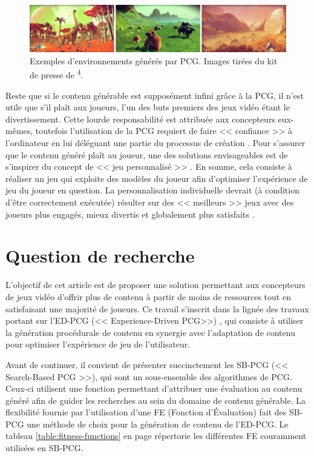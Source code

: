 \documentclass[a4paper,11pt]{article}
\begin{document}
      \begin{figure}
        \centering
        \includegraphics[width=\textwidth]{fig1.png}
        \caption{Exemples d'environnements générés par PCG. Images tirées du kit de presse de \textsuperscript{4}.}
        \label{fig:pcg}
      \end{figure}

      Reste que si le contenu générable est supposément infini grâce à la PCG, il n'est utile que s'il plaît aux joueurs, l'un des buts premiers des jeux vidéo étant le divertissement.
      Cette lourde responsabilité est attribuée aux concepteurs eux-mêmes, toutefois l'utilisation de la PCG requiert de faire << confiance >> à l'ordinateur en lui déléguant une partie du processus de création \cite{Riedl}.  
      Pour s'assurer que le contenu généré plaît au joueur, une des solutions envisageables est de s'inspirer du concept de << jeu personnalisé >> \cite{Bakkes}.
      En somme, cela consiste à réaliser un jeu qui exploite des modèles du joueur afin d'optimiser l'expérience de jeu du joueur en question.
      La personnalisation individuelle devrait (à condition d'être correctement exécutée) résulter sur des << meilleurs >> jeux avec des joueurs plus engagés, mieux divertis et globalement plus satisfaits \cite{Bakkes}.
      
    \section{Question de recherche}\label{section:subject}

      L'objectif de cet article est de proposer une solution permettant aux concepteurs de jeux vidéo d'offrir plus de contenu à partir de moins de ressources tout en satisfaisant une majorité de joueurs.
      Ce travail s'inscrit dans la lignée des travaux portant sur l'ED-PCG (<< Experience-Driven PCG>>) \cite{Yannakakis}, qui consiste à utiliser la génération procédurale de contenu en synergie avec l'adaptation de contenu pour optimiser l'expérience de jeu de l'utilisateur.
      
      Avant de continuer, il convient de présenter succinctement les SB-PCG (<< Search-Based PCG >>), qui sont un sous-ensemble des algorithmes de PCG. 
      Ceux-ci utilisent une fonction permettant d'attribuer une évaluation au contenu généré afin de guider les recherches au sein du domaine de contenu générable.
      La flexibilité fournie par l'utilisation d'une FE (Fonction d'Évaluation) fait des SB-PCG une méthode de choix pour la génération de contenu de l'ED-PCG. 
      Le tableau \ref{table:fitness-functions} en page \pageref{table:fitness-functions} répertorie les différentes FE couramment utilisées en SB-PCG. 
      
\end{document}
